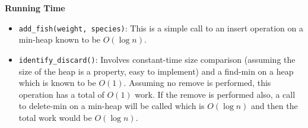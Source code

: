 \documentclass[12pt,twoside]{article}
\begin{document}
\begin{problems}
\begin{problemparts}
    {\bf Running Time}
    \begin{itemize}
        \item {\tt add\_fish(weight, species)}: This is a simple call to an
        insert operation on a min-heap known to be $ O(\log n) $.
        \item {\tt identify\_discard()}: Involves constant-time size
        comparison (assuming the size of the heap is a property, easy to
        implement) and a find-min on a heap which is known to be $ O(1) $.
        Assuming no remove is performed, this operation has a total of $ O(1)
        $ work. If the remove is performed also, a call to delete-min on a
        min-heap will be called which is $ O(\log n ) $ and then the total
        work would be $ O(\log n)$.
    \end{itemize}

\end{problemparts}

\newpage
\problem


\end{problems}
\end{document}
